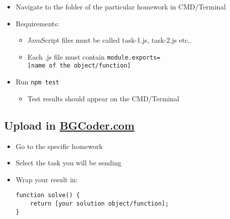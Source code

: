 \begin{itemize}
\tightlist
\item
  Navigate to the folder of the particular homework in CMD/Terminal
\item
  Requirements:

  \begin{itemize}
  \tightlist
  \item
    JavaScript files must be called task-1.js, task-2.js etc..
  \item
    Each .js file must contain
    \texttt{module.exports={[}name\ of\ the\ object/function{]}}
  \end{itemize}
\item
  Run \texttt{npm\ test}

  \begin{itemize}
  \tightlist
  \item
    Test results should appear on the CMD/Terminal
  \end{itemize}
\end{itemize}

\subsection{\texorpdfstring{Upload in
\href{http://bgcoder.com/}{BGCoder.com}}{Upload in BGCoder.com}}\label{upload-in-bgcoder.com}

\begin{itemize}
\item
  Go to the specific homework
\item
  Select the task you will be sending
\item
  Wrap your result in:

\begin{verbatim}
function solve() {
    return [your solution object/function];
}
\end{verbatim}
\end{itemize}
